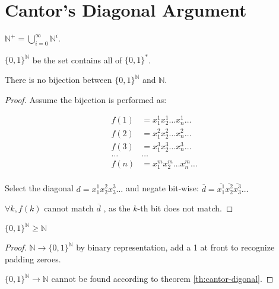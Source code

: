 \section{Cantor's Diagonal Argument}

\begin{definition}[$\mathbb{N}^+$]
\(\mathbb{N}^+ = \bigcup_{i=0}^{\infty} \mathbb{N}^i\).
\end{definition}

\begin{definition}[\(\{0,1\}^\mathbb{N}\)]
\(\{0,1\}^\mathbb{N}\) be the set contains all of \(\{0,1\}^*\).
\end{definition}

\begin{theorem}\label{th:cantor-digonal}
There is no bijection between $\{0,1\}^\mathbb{N}$ and $\mathbb{N}$.
\end{theorem}

\begin{proof}

Assume the bijection is performed as:

\begin{align*}
f(1) &= x_1^1 x_2^1 \dots x_n^1 \dots \\
f(2) &= x_1^2 x_2^2 \dots x_n^2 \dots \\
f(3) &= x_1^3 x_2^3 \dots x_n^3 \dots \\
\dots & \dots \\
f(n) &= x_1^m x_2^m \dots x_n^m \dots \\
\end{align*}

Select the diagonal $d = x_1^1x_2^2x_3^3\dots$ and negate bit-wise: \(\overline{d} = \overline{x_1^1}\overline{x_2^2}\overline{x_3^3}\dots\)

\(\forall k, f(k)\) cannot match \(\overline{d}\) , as the \(k\)-th bit does not
match.
\end{proof}

\begin{corollary}
 \(\{0,1\}^\mathbb{N} \ge \mathbb{N}\)
\end{corollary}

\begin{proof}
\(\mathbb{N} \rightarrow \{0,1\}^\mathbb{N}\) by binary representation,
add a 1 at front to recognize padding zeroes.

\(\{0,1\}^\mathbb{N} \rightarrow \mathbb{N}\) cannot be found according to theorem \ref{th:cantor-digonal}.
\end{proof}

